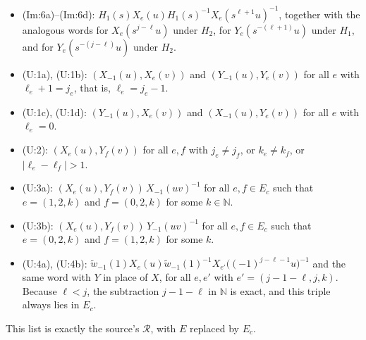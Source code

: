 \documentclass[11pt]{article}
\theoremstyle{definition}
\theoremstyle{remark}
\newcommand{\wt}{\widetilde{w}}
\newcommand{\cR}{\mathcal{R}}
\begin{document}
\begin{itemize}
\item (Im:6a)--(Im:6d): $H_1(s)X_e(u)H_1(s)^{-1}X_e(s^{\ell+1}u)^{-1}$, together with the analogous words for $X_e(s^{j-\ell}u)$ under $H_2$, for $Y_e(s^{-(\ell+1)}u)$ under $H_1$, and for $Y_e(s^{-(j-\ell)}u)$ under $H_2$.
\item (U:1a), (U:1b): $(X_{-1}(u),X_e(v))$ and $(Y_{-1}(u),Y_e(v))$ for all $e$ with $\ell_e+1=j_e$, that is, $\ell_e=j_e-1$.
\item (U:1c), (U:1d): $(Y_{-1}(u),X_e(v))$ and $(X_{-1}(u),Y_e(v))$ for all $e$ with $\ell_e=0$.
\item (U:2): $(X_e(u),Y_f(v))$ for all $e,f$ with $j_e\neq j_f$, or $k_e\neq k_f$, or $|\ell_e-\ell_f|>1$.
\item (U:3a): $(X_e(u),Y_f(v))\,X_{-1}(uv)^{-1}$ for all $e,f\in E_c$ such that $e=(1,2,k)$ and $f=(0,2,k)$ for some $k\in\mathbb{N}$.
\item (U:3b): $(X_e(u),Y_f(v))\,Y_{-1}(uv)^{-1}$ for all $e,f\in E_c$ such that $e=(0,2,k)$ and $f=(1,2,k)$ for some $k$.
\item (U:4a), (U:4b): $\wt_{-1}(1)X_e(u)\wt_{-1}(1)^{-1}X_{e'}\bigl((-1)^{j-\ell-1}u\bigr)^{-1}$ and the same word with $Y$ in place of $X$, for all $e,e'$ with $e'=(j-1-\ell,j,k)$. Because $\ell<j$, the subtraction $j-1-\ell$ in $\mathbb{N}$ is exact, and this triple always lies in $E_c$.
\end{itemize}
This list is exactly the source's $\cR$, with $E$ replaced by $E_c$.
\end{document}
